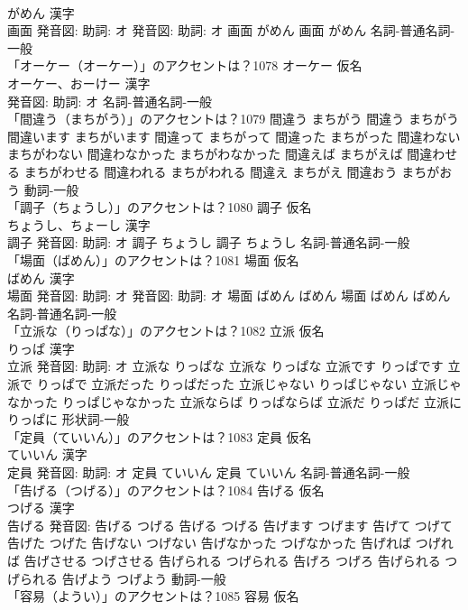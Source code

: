 \documentclass[8pt]{extreport}
\begin{document}
\begin{CJK}{UTF8}{min}
\\	がめん 漢字　
\\	画面 発音図: 助詞: オ 発音図: 助詞: オ	画面 がめん		画面 がめん				名詞-普通名詞-一般 
\\	「オーケー（オーケー）」のアクセントは？1078	オーケー 仮名　
\\	オーケー、おーけー 漢字　
\\	発音図: 助詞: オ							名詞-普通名詞-一般 
\\	「間違う（まちがう）」のアクセントは？1079		間違う まちがう		間違う まちがう 間違います まちがいます 間違って まちがって 間違った まちがった 間違わない まちがわない 間違わなかった まちがわなかった 間違えば まちがえば 間違わせる まちがわせる 間違われる まちがわれる 間違え まちがえ 間違おう まちがおう				動詞-一般 
\\	「調子（ちょうし）」のアクセントは？1080	調子 仮名　
\\	ちょうし、ちょーし 漢字　
\\	調子 発音図: 助詞: オ	調子 ちょうし		調子 ちょうし				名詞-普通名詞-一般 
\\	「場面（ばめん）」のアクセントは？1081	場面 仮名　
\\	ばめん 漢字　
\\	場面 発音図: 助詞: オ 発音図: 助詞: オ	場面 ばめん ばめん		場面 ばめん ばめん				名詞-普通名詞-一般 
\\	「立派な（りっぱな）」のアクセントは？1082	立派 仮名　
\\	りっぱ 漢字　
\\	立派 発音図: 助詞: オ	立派な りっぱな		立派な りっぱな 立派です りっぱです 立派で りっぱで 立派だった りっぱだった 立派じゃない りっぱじゃない 立派じゃなかった りっぱじゃなかった 立派ならば りっぱならば 立派だ りっぱだ 立派に りっぱに				形状詞-一般 
\\	「定員（ていいん）」のアクセントは？1083	定員 仮名　
\\	ていいん 漢字　
\\	定員 発音図: 助詞: オ	定員 ていいん		定員 ていいん				名詞-普通名詞-一般 
\\	「告げる（つげる）」のアクセントは？1084	告げる 仮名　
\\	つげる 漢字　
\\	告げる 発音図:	告げる つげる		告げる つげる 告げます つげます 告げて つげて 告げた つげた 告げない つげない 告げなかった つげなかった 告げれば つげれば 告げさせる つげさせる 告げられる つげられる 告げろ つげろ 告げられる つげられる 告げよう つげよう				動詞-一般 
\\	「容易（ようい）」のアクセントは？1085	容易 仮名　

\end{CJK}
\end{document}
